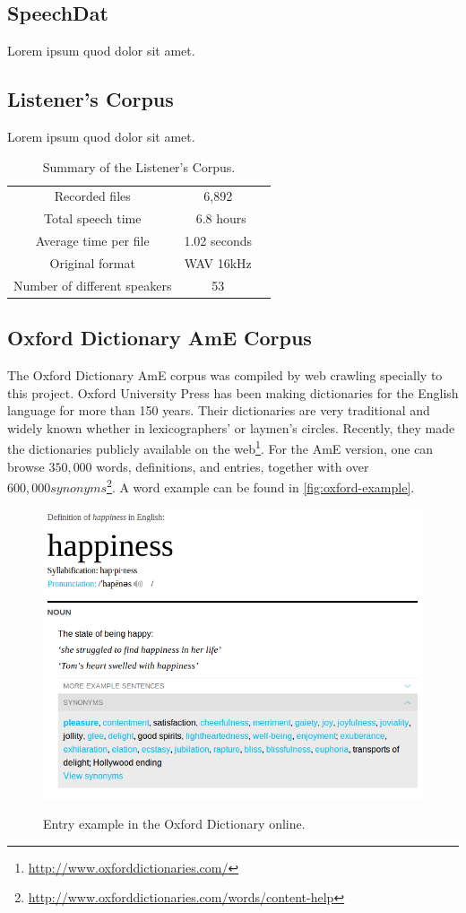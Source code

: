 \clearpage
\subsection{SpeechDat}
Lorem ipsum quod dolor sit amet.

\subsection{Listener's Corpus}
Lorem ipsum quod dolor sit amet.

\begin{table}[H]
\caption[Summary of Listener's Corpus.]{Summary of the Listener's Corpus.}
\smallskip
\centering
\begin{tabular}{ccc} \toprule
  Recorded files & 6,892 \\
  Total speech time & ~6.8 hours \\
  Average time per file & 1.02 seconds \\
  Original format & WAV 16kHz \\
  Number of different speakers & 53 \\
  \bottomrule
\end{tabular}
\end{table}

\clearpage
\subsection{Oxford Dictionary AmE Corpus}
The Oxford Dictionary \ac{AmE} corpus was compiled by web crawling specially to this project. Oxford University Press
has been making dictionaries for the English language for more than 150 years. Their dictionaries are very traditional and widely 
known whether in lexicographers' or laymen's circles. Recently, they made the dictionaries publicly available
on the web\footnote{\url{http://www.oxforddictionaries.com/}}. For the \ac{AmE} version, one can browse $350,000$ words, definitions, 
and entries, together with over $600,000 synonyms$\footnote{\url{http://www.oxforddictionaries.com/words/content-help}}.
A word example can be found in \autoref{fig:oxford-example}.

\begin{figure}[H]
        \myfloatalign
        {\includegraphics[width=.66\linewidth]{gfx/example-oxford-definition.png}}
        \caption{Entry example in the Oxford Dictionary online.}
        \label{fig:oxford-example}
\end{figure}

